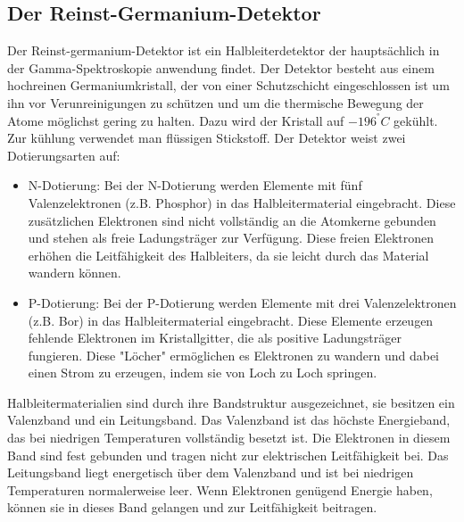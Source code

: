 \subsection{Der Reinst-Germanium-Detektor}
Der Reinst-germanium-Detektor ist ein Halbleiterdetektor der hauptsächlich in der Gamma-Spektroskopie anwendung findet. Der Detektor besteht aus
einem hochreinen Germaniumkristall, der von einer Schutzschicht eingeschlossen ist um ihn vor Verunreinigungen zu schützen und um die 
thermische Bewegung der Atome möglichst gering zu halten. Dazu wird der Kristall auf $-196^°C$ gekühlt. Zur kühlung verwendet man flüssigen Stickstoff.
Der Detektor weist zwei Dotierungsarten auf:
\begin{itemize}
\item N-Dotierung: Bei der N-Dotierung werden Elemente mit fünf Valenzelektronen (z.B. Phosphor) in das Halbleitermaterial eingebracht. 
Diese zusätzlichen Elektronen sind nicht vollständig an die Atomkerne gebunden und stehen als freie Ladungsträger zur Verfügung. Diese freien Elektronen
erhöhen die Leitfähigkeit des Halbleiters, da sie leicht durch das Material wandern können.
\item P-Dotierung: Bei der P-Dotierung werden Elemente mit drei Valenzelektronen (z.B. Bor) in das Halbleitermaterial eingebracht.
Diese Elemente erzeugen fehlende Elektronen im Kristallgitter, die als positive Ladungsträger fungieren. Diese "Löcher" ermöglichen es Elektronen
zu wandern und dabei einen Strom zu erzeugen, indem sie von Loch zu Loch springen.
\end{itemize}
Halbleitermaterialien sind durch ihre Bandstruktur ausgezeichnet, sie besitzen ein Valenzband und ein Leitungsband.
Das Valenzband ist das höchste Energieband, das bei niedrigen Temperaturen vollständig besetzt ist. Die Elektronen in diesem Band sind fest
gebunden und tragen nicht zur elektrischen Leitfähigkeit bei. Das Leitungsband liegt energetisch über dem Valenzband und ist bei niedrigen Temperaturen 
normalerweise leer. Wenn Elektronen genügend Energie haben, können sie in dieses Band gelangen und zur Leitfähigkeit beitragen.

